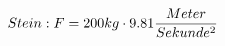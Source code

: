 \documentclass[preview]{standalone}
\begin{document}
\begin{align*}
\special{dvisvgm:raw <g id='unique000'>}Stein: F = 200 kg \cdot 9.81 \frac{Meter}{Sekunde^{2}}\special{dvisvgm:raw </g>}
\end{align*}
\end{document}
